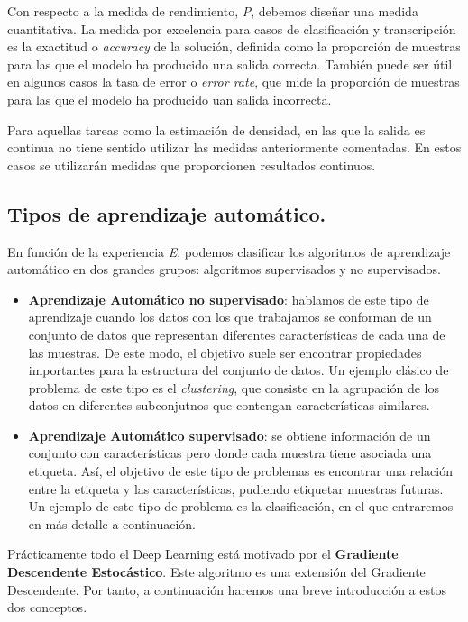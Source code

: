 	Con respecto a la medida de rendimiento, \textit{P}, debemos diseñar una medida cuantitativa. La medida por excelencia para casos de clasificación y transcripción es la exactitud o \textit{accuracy} de la solución, definida como la proporción de muestras para las que el modelo ha producido una salida correcta. También puede ser útil en algunos casos la tasa de error o \textit{error rate}, que mide la proporción de muestras para las que el modelo ha producido uan salida incorrecta. 
	
	Para aquellas tareas como la estimación de densidad, en las que la salida es continua no tiene sentido utilizar las medidas anteriormente comentadas. En estos casos se utilizarán medidas que proporcionen resultados continuos.
	
	\subsection{Tipos de aprendizaje automático.}
	
	En función de la experiencia \textit{E}, podemos clasificar los algoritmos de aprendizaje automático en dos grandes grupos: algoritmos supervisados y no supervisados.
	
	
	\begin{itemize}
		\item \textbf{Aprendizaje Automático no supervisado}: hablamos de este tipo de aprendizaje cuando los datos con los que trabajamos se conforman de un conjunto de datos que representan diferentes características de cada una de las muestras. De este modo, el objetivo suele ser encontrar propiedades importantes para la estructura del conjunto de datos. Un ejemplo clásico de problema de este tipo es el \textit{clustering}, que consiste en la agrupación de los datos en diferentes subconjutnos que contengan características similares.
		
		\item \textbf{Aprendizaje Automático supervisado}: se obtiene información de un conjunto con características pero donde cada muestra tiene asociada una etiqueta. Así, el objetivo de este tipo de problemas es encontrar una relación entre la etiqueta y las características, pudiendo etiquetar muestras futuras. Un ejemplo de este tipo de problema es la clasificación, en el que entraremos en más detalle a continuación.
	\end{itemize}

	Prácticamente todo el Deep Learning está motivado por el \textbf{Gradiente Descendente Estocástico}. Este algoritmo es una extensión del Gradiente Descendente. Por tanto, a continuación haremos una breve introducción a estos dos conceptos.
	
